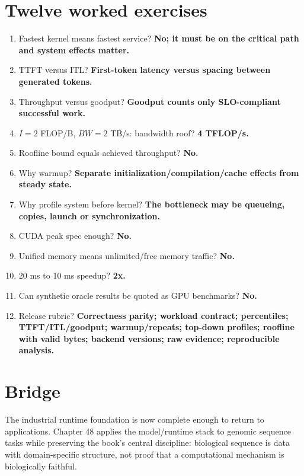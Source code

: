 \section{Twelve worked exercises}
\begin{enumerate}
\item Fastest kernel means fastest service? \textbf{No; it must be on the critical path and system effects matter.}
\item TTFT versus ITL? \textbf{First-token latency versus spacing between generated tokens.}
\item Throughput versus goodput? \textbf{Goodput counts only SLO-compliant successful work.}
\item $I=2$ FLOP/B, $BW=2$ TB/s: bandwidth roof? \textbf{4 TFLOP/s.}
\item Roofline bound equals achieved throughput? \textbf{No.}
\item Why warmup? \textbf{Separate initialization/compilation/cache effects from steady state.}
\item Why profile system before kernel? \textbf{The bottleneck may be queueing, copies, launch or synchronization.}
\item CUDA peak spec enough? \textbf{No.}
\item Unified memory means unlimited/free memory traffic? \textbf{No.}
\item 20 ms to 10 ms speedup? \textbf{2x.}
\item Can synthetic oracle results be quoted as GPU benchmarks? \textbf{No.}
\item Release rubric? \textbf{Correctness parity; workload contract; percentiles; TTFT/ITL/goodput; warmup/repeats; top-down profiles; roofline with valid bytes; backend versions; raw evidence; reproducible analysis.}
\end{enumerate}

\section{Bridge}
The industrial runtime foundation is now complete enough to return to applications. Chapter 48 applies the model/runtime stack to genomic sequence tasks while preserving the book's central discipline: biological sequence is data with domain-specific structure, not proof that a computational mechanism is biologically faithful.
